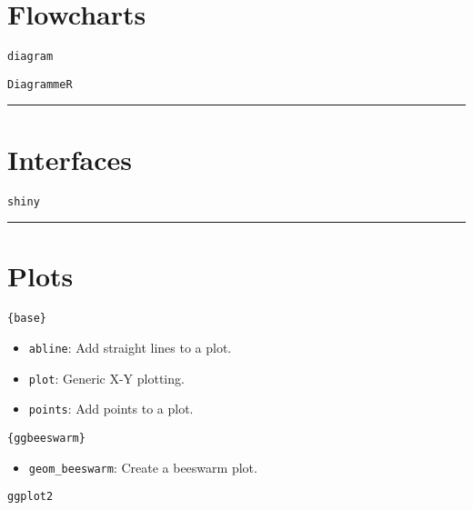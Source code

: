 \documentclass[]{book}
\providecommand{\tightlist}{%
  \setlength{\itemsep}{0pt}\setlength{\parskip}{0pt}}
\begin{document}
\hypertarget{flowcharts}{%
\section{Flowcharts}\label{flowcharts}}

\texttt{diagram}

\texttt{DiagrammeR}

\begin{center}\rule{0.5\linewidth}{\linethickness}\end{center}

\hypertarget{interfaces}{%
\section{Interfaces}\label{interfaces}}

\texttt{shiny}

\begin{center}\rule{0.5\linewidth}{\linethickness}\end{center}

\hypertarget{plots}{%
\section{Plots}\label{plots}}

\texttt{\{base\}}

\begin{itemize}
\tightlist
\item
  \texttt{abline}: Add straight lines to a plot.
\item
  \texttt{plot}: Generic X-Y plotting.
\item
  \texttt{points}: Add points to a plot.
\end{itemize}

\texttt{\{ggbeeswarm\}}

\begin{itemize}
\tightlist
\item
  \texttt{geom\_beeswarm}: Create a beeswarm plot.
\end{itemize}

\texttt{ggplot2}
\end{document}
